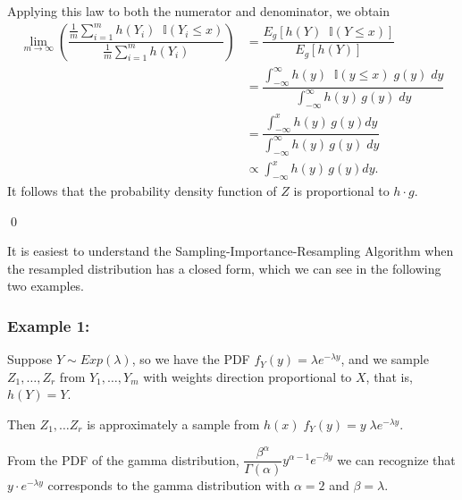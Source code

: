 \documentclass[12pt,twoside]{smiththesis}
\begin{document}
Applying this law to both the numerator and denominator, we obtain
\begin{align*}  \lim_{m \to \infty} \left( \dfrac{ \frac 1m {\sum_{i=1}^mh(Y_i) }  \;\;\mathbb{I} (Y_i \leq x) }{\frac 1m \sum_{i=1}^mh(Y_i) } \right) &= \dfrac{ E_g[ h(Y) \;\; \mathbb I (Y \leq x) ]  }{ E_g[ h(Y) ]  }\\
&= \dfrac{\int_{-\infty}^\infty h(y) \;\; \mathbb I (y \leq x) \; g(y) \; dy}{\int_{-\infty}^\infty h(y) \, g(y) \;dy}\\
&= \dfrac{\int_{-\infty}^x h(y) \, g(y) dy}{\int_{-\infty}^\infty h(y) \, g(y) \;dy}\\
&\propto \int_{-\infty}^x h(y) \, g(y) dy. 
\end{align*}
It follows that the probability density function of \(Z\) is proportional to \(h \cdot g\).

\vspace{3 mm}

\qed

It is easiest to understand the Sampling-Importance-Resampling Algorithm when the resampled distribution has a closed form, which we can see in the following two examples.

\newpage

\hypertarget{example-1}{%
\subsubsection{Example 1:}\label{example-1}}

Suppose \(Y \sim Exp(\lambda)\), so we have the PDF \(f_Y(y) = \lambda e^{-\lambda y}\), and we sample \(Z_1,\dots,Z_r\) from \(Y_1, \dots, Y_m\) with weights direction proportional to \(X\), that is, \(h(Y) = Y\).

Then \(Z_1,\dots Z_r\) is approximately a sample from \(h(x) \; f_Y(y) = y \; \lambda e^{-\lambda y}\).

From the PDF of the gamma distribution, \(\dfrac{\beta^\alpha}{\Gamma(\alpha) }y^{\alpha - 1} e^{-\beta y}\) we can recognize that \(y \cdot e^{-\lambda y}\) corresponds to the gamma distribution with \(\alpha = 2\) and \(\beta = \lambda\).
\end{document}
